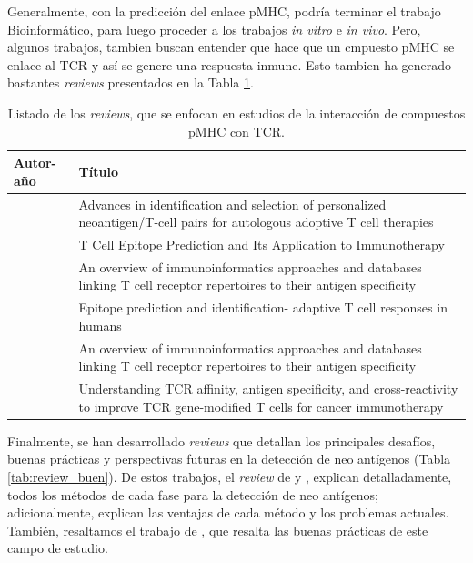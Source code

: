Generalmente, con la predicción del enlace pMHC, podría terminar el trabajo Bioinformático, para luego proceder a los trabajos \textit{in vitro} e \textit{in vivo}. Pero, algunos trabajos, tambien buscan entender que hace que un cmpuesto pMHC se enlace al TCR y así se genere una respuesta inmune. Esto tambien ha generado bastantes \textit{reviews} presentados en la Tabla \ref{tab:review_tcr}.

\begin{table}[H]
	\caption{Listado de los \textit{reviews}, que se enfocan en estudios de la interacción de compuestos pMHC con TCR.}
	\label{tab:review_tcr}
	\begin{tabular}{p{3cm}p{10cm}}
		\textbf{Autor-año }                            & \textbf{Título}                                                                                                                             \\ \hline
		\cite{kast2021advances}     & Advances in identification and selection of personalized neoantigen/T-cell pairs for autologous adoptive T cell therapies           \\
		\cite{schaap2021t}          & T Cell Epitope Prediction and Its Application to Immunotherapy                                                                      \\                                    
		\cite{zvyagin2020overview}  & An overview of immunoinformatics approaches and databases linking T cell receptor repertoires to their antigen specificity          \\
		\cite{sidney2020epitope}    & Epitope prediction and identification- adaptive T cell responses in humans                                                          \\
		
		\cite{zvyagin2020overview}  & An overview of immunoinformatics approaches and databases linking T cell receptor repertoires to their antigen specificity          \\
		\cite{spear2019understanding} & Understanding TCR affinity, antigen specificity, and cross-reactivity to improve TCR gene-modified T cells for cancer immunotherapy \\		                                               
		\end{tabular}
	\end{table}


Finalmente, se han desarrollado \textit{reviews} que detallan los principales desafíos, buenas prácticas y perspectivas futuras en la detección de neo antígenos (Tabla \ref{tab:review_buen}). De estos trabajos, el \textit{review} de \cite{gopanenko2020main} y \cite{borden2022cancer}, explican detalladamente, todos los métodos de cada fase para la detección de neo antígenos; adicionalmente, explican las ventajas de cada método y los problemas actuales. También, resaltamos el trabajo de \cite{richters2019best}, que resalta las buenas prácticas de este campo de estudio.




